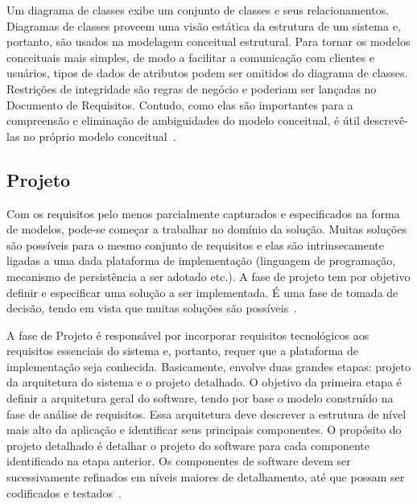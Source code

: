 Um diagrama de classes exibe um conjunto de classes e seus relacionamentos. Diagramas de classes proveem uma visão estática da estrutura de um sistema e, portanto, são usados na modelagem conceitual estrutural. Para tornar os modelos conceituais mais simples, de modo a facilitar a comunicação com clientes e usuários, tipos de dados de atributos podem ser omitidos do diagrama de classes. Restrições de integridade são regras de negócio e poderiam ser lançadas no Documento de Requisitos. Contudo, como elas são importantes para a compreensão e eliminação de ambiguidades do modelo conceitual, é útil descrevê-las no próprio modelo conceitual~\cite{falboEngReq}. 





\subsection{Projeto}
\label{sec-referencial-engenharia-software-atividade-desenvolvimento-projeto}

Com os requisitos pelo menos parcialmente capturados e especificados na forma de modelos, pode-se começar a trabalhar no domínio da solução. Muitas soluções são possíveis para o mesmo conjunto de requisitos e elas são intrinsecamente ligadas a uma dada plataforma de implementação (linguagem de programação, mecanismo de persistência a ser adotado etc.). A fase de projeto tem por objetivo definir e especificar uma solução a ser implementada. É uma fase de tomada de decisão, tendo em vista que muitas soluções são possíveis~\cite{falboEngReq}.

A fase de Projeto é responsável por incorporar requisitos tecnológicos aos requisitos essenciais do sistema e, portanto, requer que a plataforma de implementação seja conhecida. Basicamente, envolve duas grandes etapas: projeto da arquitetura do sistema e o projeto detalhado. O objetivo da primeira etapa é definir a arquitetura geral do software, tendo por base o modelo construído na fase de análise de requisitos. Essa arquitetura deve descrever a estrutura de nível mais alto da aplicação e identificar seus principais componentes. O propósito do projeto detalhado é detalhar o projeto do software para cada componente identificado na etapa anterior. Os componentes de software devem ser sucessivamente refinados em níveis maiores de detalhamento, até que possam ser codificados e testados~\cite{falboEngSoft}. 





